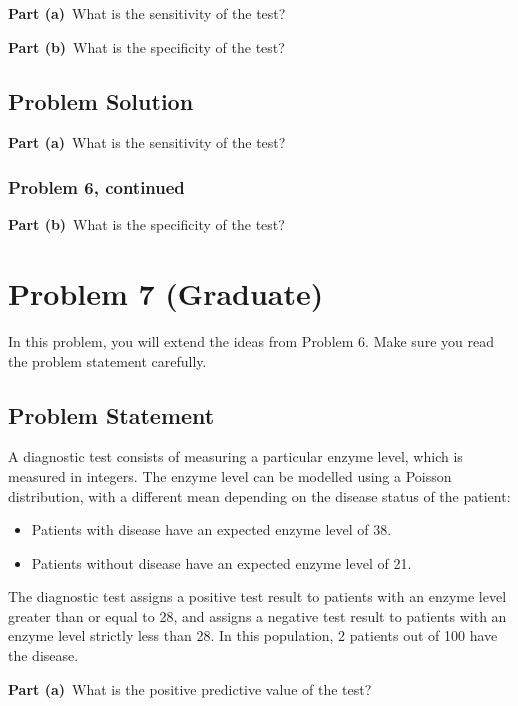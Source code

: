 \documentclass[12pt]{article}
\theoremstyle{definition}
\begin{document}
\bigskip
\noindent
{\bf Part (a)}\ What is the sensitivity of the test?

\bigskip
\noindent
{\bf Part (b)}\ What is the specificity of the test?


\subsection*{Problem Solution}

\noindent
{\bf Part (a)}\ What is the sensitivity of the test?


\newpage
\subsubsection*{Problem 6, continued}

\vspace{1.5in}
\noindent
{\bf Part (b)}\ What is the specificity of the test?




\newpage
\section*{Problem 7 (Graduate)}

In this problem, you will extend the ideas from Problem 6. Make sure you read the problem statement carefully.

\subsection*{Problem Statement}

A diagnostic test consists of measuring a particular enzyme level, which is measured in integers. The enzyme level can be modelled using a Poisson distribution, with a different mean depending on the disease status of the patient:
\begin{itemize}
	\item Patients with disease have an expected enzyme level of 38.
	\item Patients without disease have an expected enzyme level of 21.
\end{itemize}
The diagnostic test assigns a positive test result to patients with an enzyme level greater than or equal to 28, and assigns a negative test result to patients with an enzyme level strictly less than 28. In this population, 2 patients out of 100 have the disease.

\bigskip
\noindent
{\bf Part (a)}\ What is the positive predictive value of the test?
\end{document}
